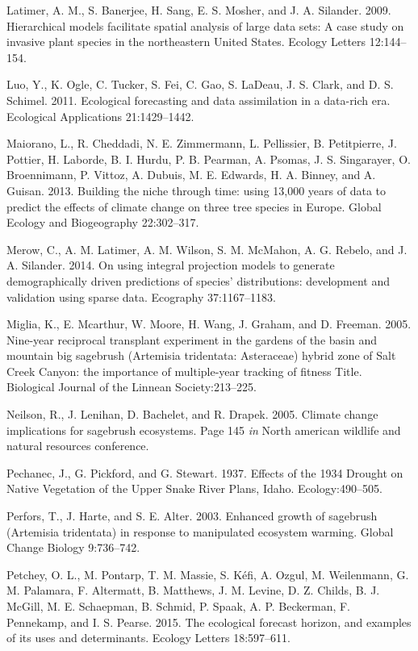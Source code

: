 \documentclass[12pt,]{article}
\begin{document}
Latimer, A. M., S. Banerjee, H. Sang, E. S. Mosher, and J. A. Silander.
2009. Hierarchical models facilitate spatial analysis of large data
sets: A case study on invasive plant species in the northeastern United
States. Ecology Letters 12:144--154.

Luo, Y., K. Ogle, C. Tucker, S. Fei, C. Gao, S. LaDeau, J. S. Clark, and
D. S. Schimel. 2011. Ecological forecasting and data assimilation in a
data-rich era. Ecological Applications 21:1429--1442.

Maiorano, L., R. Cheddadi, N. E. Zimmermann, L. Pellissier, B.
Petitpierre, J. Pottier, H. Laborde, B. I. Hurdu, P. B. Pearman, A.
Psomas, J. S. Singarayer, O. Broennimann, P. Vittoz, A. Dubuis, M. E.
Edwards, H. A. Binney, and A. Guisan. 2013. Building the niche through
time: using 13,000 years of data to predict the effects of climate
change on three tree species in Europe. Global Ecology and Biogeography
22:302--317.

Merow, C., A. M. Latimer, A. M. Wilson, S. M. McMahon, A. G. Rebelo, and
J. A. Silander. 2014. On using integral projection models to generate
demographically driven predictions of species' distributions:
development and validation using sparse data. Ecography 37:1167--1183.

Miglia, K., E. Mcarthur, W. Moore, H. Wang, J. Graham, and D. Freeman.
2005. Nine-year reciprocal transplant experiment in the gardens of the
basin and mountain big sagebrush (Artemisia tridentata: Asteraceae)
hybrid zone of Salt Creek Canyon: the importance of multiple-year
tracking of fitness Title. Biological Journal of the Linnean
Society:213--225.

Neilson, R., J. Lenihan, D. Bachelet, and R. Drapek. 2005. Climate
change implications for sagebrush ecosystems. Page 145 \emph{in} North
american wildlife and natural resources conference.

Pechanec, J., G. Pickford, and G. Stewart. 1937. Effects of the 1934
Drought on Native Vegetation of the Upper Snake River Plans, Idaho.
Ecology:490--505.

Perfors, T., J. Harte, and S. E. Alter. 2003. Enhanced growth of
sagebrush (Artemisia tridentata) in response to manipulated ecosystem
warming. Global Change Biology 9:736--742.

Petchey, O. L., M. Pontarp, T. M. Massie, S. K{é}fi, A. Ozgul, M.
Weilenmann, G. M. Palamara, F. Altermatt, B. Matthews, J. M. Levine, D.
Z. Childs, B. J. McGill, M. E. Schaepman, B. Schmid, P. Spaak, A. P.
Beckerman, F. Pennekamp, and I. S. Pearse. 2015. The ecological forecast
horizon, and examples of its uses and determinants. Ecology Letters
18:597--611.
\end{document}
